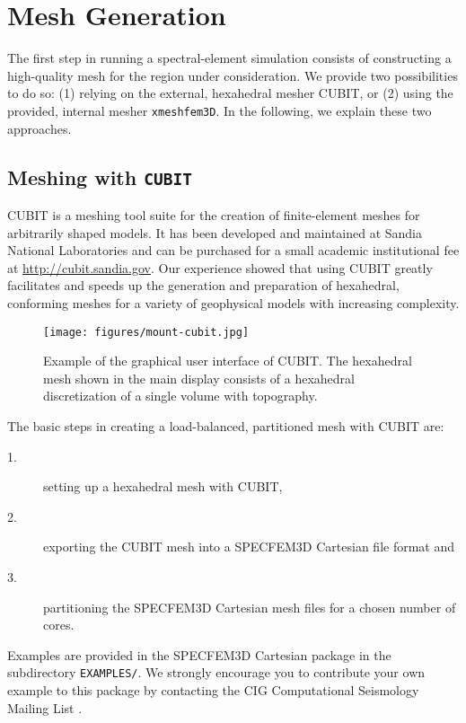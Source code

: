 \chapter{Mesh Generation}\label{cha:Mesh-Generation}

The first step in running a spectral-element simulation consists of
constructing a high-quality mesh for the region under consideration.
We provide two possibilities to do so: (1) relying on the external,
hexahedral mesher CUBIT, or (2) using the provided, internal mesher
\texttt{xmeshfem3D}. In the following, we explain these two approaches.


\section{Meshing with \texttt{CUBIT}}\label{cha:Running-the-Mesher-CUBIT}

CUBIT is a meshing tool suite for the creation of finite-element meshes
for arbitrarily shaped models. It has been developed and maintained
at Sandia National Laboratories and can be purchased for a small academic
institutional fee at \url{http://cubit.sandia.gov}. Our experience
showed that using CUBIT greatly facilitates and speeds up the generation
and preparation of hexahedral, conforming meshes for a variety of
geophysical models with increasing complexity.

\begin{figure}[htbp]
\begin{centering}
\texttt{[image: figures/mount-cubit.jpg]}
\par
\end{centering}
\caption{Example of the graphical user interface of CUBIT. The hexahedral mesh
shown in the main display consists of a hexahedral discretization
of a single volume with topography.}
\label{fig:mount.cubit}
\end{figure}

\noindent
The basic steps in creating a load-balanced, partitioned mesh with
CUBIT are:
\begin{description}
\item [{1.}] setting up a hexahedral mesh with CUBIT,
\item [{2.}] exporting the CUBIT mesh into a SPECFEM3D Cartesian file format
and
\item [{3.}] partitioning the SPECFEM3D Cartesian mesh files for a chosen
number of cores.
\end{description}
Examples are provided in the SPECFEM3D Cartesian package in the subdirectory
\texttt{EXAMPLES/}. We strongly encourage you to contribute your own
example to this package by contacting the CIG Computational Seismology
Mailing List .


